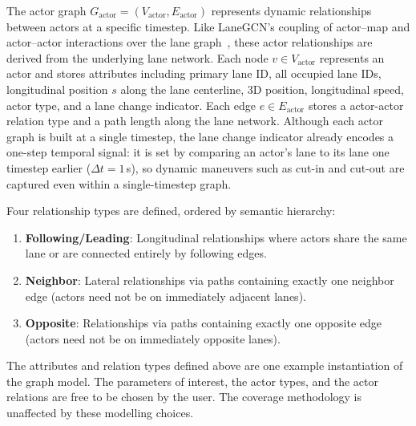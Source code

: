 The actor graph $G_{\text{actor}} = (V_{\text{actor}}, E_{\text{actor}})$ represents dynamic relationships between actors at a specific timestep. Like LaneGCN's coupling of actor--map and actor--actor interactions over the lane graph~\cite{liang2020lanegcn}, these actor relationships are derived from the underlying lane network. Each node $v \in V_{\text{actor}}$ represents an actor and stores attributes including primary lane ID, 
all occupied lane IDs, longitudinal position $s$ along the lane centerline, 3D position, longitudinal speed, actor type, and a lane change indicator. Each edge $e \in E_{\text{actor}}$ stores a actor-actor relation type and a path length along the lane network.
Although each actor graph is built at a single timestep, the lane change indicator already encodes a one-step temporal signal: it is set by comparing an actor's lane to its lane one timestep earlier ($\Delta t = 1$\,s), so dynamic maneuvers such as cut-in and cut-out are captured even within a single-timestep graph.

\label{subsubsec:relation_types}

Four relationship types are defined, ordered by semantic hierarchy:
\begin{enumerate}
    \item \textbf{Following/Leading}: Longitudinal relationships where actors share the same lane or are connected entirely by following edges.
    \item \textbf{Neighbor}: Lateral relationships via paths containing exactly one neighbor edge (actors need not be on immediately adjacent lanes).
    \item \textbf{Opposite}: Relationships via paths containing exactly one opposite edge (actors need not be on immediately opposite lanes).
\end{enumerate}

The attributes and relation types defined above are one example instantiation of the graph model. The parameters of interest, the actor types, and the actor relations are free to be chosen by the user. The coverage methodology is unaffected by these modelling choices.

